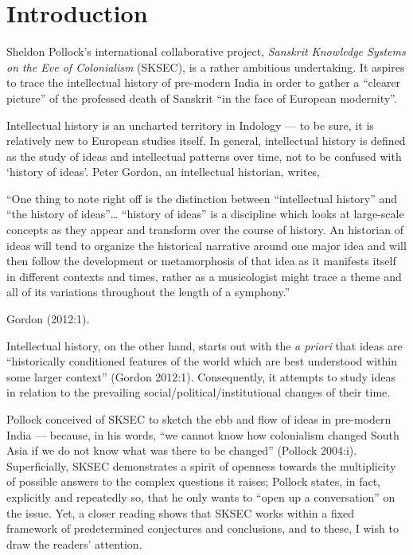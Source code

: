 \section*{Introduction}

Sheldon Pollock’s international collaborative project, {\sl Sanskrit Knowledge Systems on the Eve of Colonialism} (SKSEC), is a rather ambitious undertaking. It aspires to trace the intellectual history of pre-modern India in order to gather a “clearer picture” of the professed death of Sanskrit “in the face of European modernity”. 

Intellectual history is an uncharted territory in Indology — to be sure, it is relatively new to European studies itself. In general, intellectual history is defined as the study of ideas and intellectual patterns over time, not to be confused with ‘history of ideas’. Peter Gordon, an intellectual historian, writes, 
\begin{myquote}
“One thing to note right off is the distinction between “intellectual history” and “the history of ideas”… “history of ideas” is a discipline which looks at large-scale concepts as they appear and transform over the course of history. An historian of ideas will tend to organize the historical narrative around one major idea and will then follow the development or metamorphosis of that idea as it manifests itself in different contexts and times, rather as a musicologist might trace a theme and all of its variations throughout the length of a symphony.” 

\hfill{Gordon (2012:1).}
\end{myquote}

Intellectual history, on the other hand, starts out with the  {\sl a priori} that ideas are “historically conditioned features of the world which are best understood within some larger context”  (Gordon 2012:1). Consequently, it attempts to study ideas in relation to the prevailing social/political/institutional changes of their time. 

Pollock conceived of SKSEC to sketch the ebb and flow of ideas in pre-modern India — because, in his words, “we cannot know how colonialism changed South Asia if we do not know what was there to be changed” (Pollock 2004:i). Superficially, SKSEC demonstrates a spirit of openness towards the multiplicity of possible answers to the complex questions it raises; Pollock states, in fact, explicitly and repeatedly so, that he only wants to “open up a conversation” on the issue. Yet, a closer reading shows that SKSEC works within a fixed framework of predetermined conjectures and conclusions, and to these, I wish to draw the readers’ attention. 

